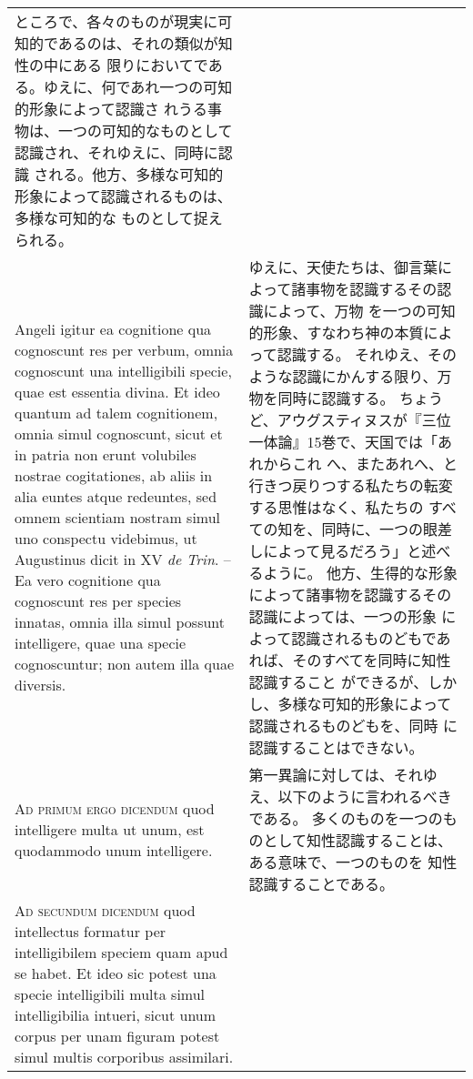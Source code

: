 \documentclass[10pt]{jsarticle} %
\begin{document}
\begin{longtable}{p{21em}p{21em}}
ところで、各々のものが現実に可知的であるのは、それの類似が知性の中にある
 限りにおいてである。ゆえに、何であれ一つの可知的形象によって認識さ
 れうる事物は、一つの可知的なものとして認識され、それゆえに、同時に認識
 される。他方、多様な可知的形象によって認識されるものは、多様な可知的な
 ものとして捉えられる。


\\


Angeli igitur ea
cognitione qua cognoscunt res per verbum, omnia cognoscunt una
intelligibili specie, quae est essentia divina. Et ideo quantum ad talem
cognitionem, omnia simul cognoscunt, sicut et in patria non erunt
volubiles nostrae cogitationes, ab aliis in alia euntes atque redeuntes,
sed omnem scientiam nostram simul uno conspectu videbimus, ut Augustinus
dicit in XV {\itshape de Trin}. --Ea vero cognitione qua cognoscunt res per species
innatas, omnia illa simul possunt intelligere, quae una specie
cognoscuntur; non autem illa quae diversis.


&

ゆえに、天使たちは、御言葉によって諸事物を認識するその認識によって、万物
 を一つの可知的形象、すなわち神の本質によって認識する。
それゆえ、そのような認識にかんする限り、万物を同時に認識する。
ちょうど、アウグスティヌスが『三位一体論』15巻で、天国では「あれからこれ
 へ、またあれへ、と行きつ戻りつする私たちの転変する思惟はなく、私たちの
 すべての知を、同時に、一つの眼差しによって見るだろう」と述べるように。
他方、生得的な形象によって諸事物を認識するその認識によっては、一つの形象
 によって認識されるものどもであれば、そのすべてを同時に知性認識すること
 ができるが、しかし、多様な可知的形象によって認識されるものどもを、同時
 に認識することはできない。



\\


{\scshape Ad primum ergo dicendum} quod intelligere
multa ut unum, est quodammodo unum intelligere.


&

第一異論に対しては、それゆえ、以下のように言われるべきである。
多くのものを一つのものとして知性認識することは、ある意味で、一つのものを
 知性認識することである。


\\


{\scshape Ad secundum dicendum} quod intellectus
formatur per intelligibilem speciem quam apud se habet. Et ideo sic
potest una specie intelligibili multa simul intelligibilia intueri,
sicut unum corpus per unam figuram potest simul multis corporibus
assimilari.



\end{longtable}
\end{document}
